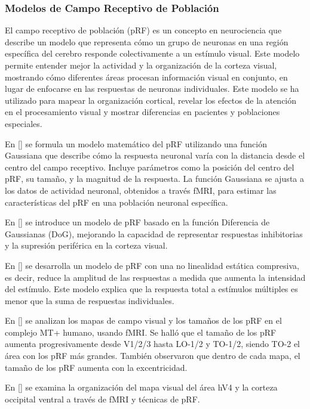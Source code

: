 \subsubsection*{Modelos de Campo Receptivo de Población} 

El campo receptivo de población (pRF) es un concepto en neurociencia que describe un modelo que representa cómo un grupo de neuronas en una región específica del cerebro responde colectivamente a un estímulo visual. Este modelo permite entender mejor la actividad y la organización de la corteza visual, mostrando cómo diferentes áreas procesan información visual en conjunto, en lugar de enfocarse en las respuestas de neuronas individuales. Este modelo se ha utilizado para mapear la organización cortical,  revelar los efectos de la atención en el procesamiento visual y  mostrar diferencias en pacientes y poblaciones especiales.

En [\cite{dumoulin_population_2008}] se formula un modelo matemático del pRF utilizando una función Gaussiana que describe cómo la respuesta neuronal varía con la distancia desde el centro del campo receptivo. Incluye parámetros como la posición del centro del pRF, su tamaño, y la magnitud de la respuesta. La función Gaussiana se ajusta a los datos de actividad neuronal, obtenidos a través fMRI, para estimar las características del pRF en una población neuronal específica.

En [\cite{zuiderbaan_modeling_2012}] se introduce un modelo de pRF basado en la función Diferencia de Gaussianas (DoG), mejorando la capacidad de representar respuestas inhibitorias y la supresión periférica en la corteza visual.

En [\cite{kay_compressive_2013}] se desarrolla un modelo de pRF con una no linealidad estática compresiva, es decir, reduce la amplitud de las respuestas a medida que aumenta la intensidad del estímulo. Este modelo explica que la respuesta total a estímulos múltiples es menor que la suma de respuestas individuales.

En [\cite{amano_visual_2009}] se analizan los mapas de campo visual y los tamaños de los pRF en el complejo MT+ humano, usando fMRI. Se hall\'o que el tamaño de los pRF aumenta progresivamente desde V1/2/3 hasta LO-1/2 y TO-1/2, siendo TO-2 el área con los pRF más grandes. También observaron que dentro de cada mapa, el tamaño de los pRF aumenta con la excentricidad. 

En [\cite{winawer_mapping_2010}] se examina la organización del mapa visual del \'area hV4 y la corteza occipital ventral a trav\'es de fMRI y técnicas de pRF. 

